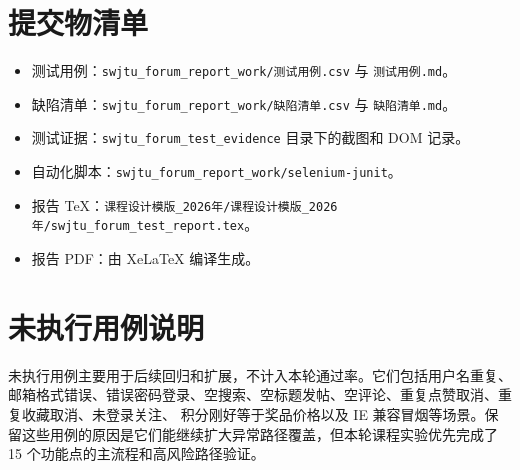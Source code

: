 \documentclass[bwprint]{report}
\begin{document}
\section{提交物清单}
\begin{itemize}
    \item 测试用例：\texttt{swjtu\_forum\_report\_work/测试用例.csv} 与 \texttt{测试用例.md}。
    \item 缺陷清单：\texttt{swjtu\_forum\_report\_work/缺陷清单.csv} 与 \texttt{缺陷清单.md}。
    \item 测试证据：\texttt{swjtu\_forum\_test\_evidence} 目录下的截图和 DOM 记录。
    \item 自动化脚本：\texttt{swjtu\_forum\_report\_work/selenium-junit}。
    \item 报告 TeX：\texttt{课程设计模版\_2026年/课程设计模版\_2026年/swjtu\_forum\_test\_report.tex}。
    \item 报告 PDF：由 XeLaTeX 编译生成。
\end{itemize}

\section{未执行用例说明}
未执行用例主要用于后续回归和扩展，不计入本轮通过率。它们包括用户名重复、邮箱格式错误、错误密码登录、空搜索、空标题发帖、空评论、重复点赞取消、重复收藏取消、未登录关注、
积分刚好等于奖品价格以及 IE 兼容冒烟等场景。保留这些用例的原因是它们能继续扩大异常路径覆盖，但本轮课程实验优先完成了 15 个功能点的主流程和高风险路径验证。
\end{document}
